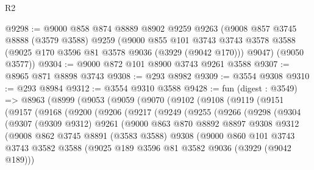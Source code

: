 \begin{lexlean}{R2}
\begin{coremodule}
@9298 := @9000
    @858
    @874
    @8889
    @8902
    @9259
    @9263
    (@9008
      @857
      @3745
      @8888
      (@3579 @3588)
      @9259
      (@9000
        @855
        @101
        @3743
        @3743
        @3578
        @3588
        (@9025 @170 @3596 @81 @3578 @9036 (@3929 (@9042 @170)))
        @9047)
      (@9050 @3577))
@9304 := @9000 @872 @101 @8900 @3743 @9261 @3588
@9307 := @8965 @871 @8898 @3743
@9308 := @293 @8982
@9309 := @3554 @9308
@9310 := @293 @8984
@9312 := @3554 @9310 @3588
@9428 := fun (digest : @3549) =>
  @8963
    (@8999
      (@9053
        (@9059
          (@9070
            (@9102
              (@9108
                (@9119
                  (@9151
                    (@9157
                      (@9168
                        (@9200
                          (@9206
                            (@9217
                              (@9249
                                (@9255
                                  (@9266
                                    (@9298
                                      (@9304
                                        (@9307
                                          (@9309 @9312)
                                          @9261
                                          (@9000
                                            @863
                                            @870
                                            @8892
                                            @8897
                                            @9308
                                            @9312
                                            (@9008
                                              @862
                                              @3745
                                              @8891
                                              (@3583 @3588)
                                              @9308
                                              (@9000
                                                @860
                                                @101
                                                @3743
                                                @3743
                                                @3582
                                                @3588
                                                (@9025
                                                  @189
                                                  @3596
                                                  @81
                                                  @3582
                                                  @9036
                                                  (@3929 (@9042 @189)))

\end{coremodule}
\end{lexlean}

